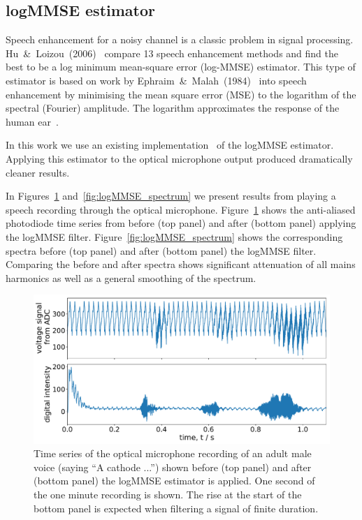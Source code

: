 \documentclass[paper-main.tex]{subfiles}
\begin{document}
\subsection{logMMSE estimator}
\label{sec:logmmse}

Speech enhancement for a noisy channel is a classic problem in signal processing. 
Hu~\&~Loizou~(2006)~\cite{SubjectiveComparison} compare 13 speech enhancement methods and find the best to be a log minimum mean-square error (log-MMSE) estimator. 
This type of estimator is based on work by Ephraim~\&~Malah~(1984)~\cite{Ephraim1984SpeechEU_logMMSE} into speech enhancement by minimising the mean square error (MSE) to the logarithm of the spectral (Fourier) amplitude.
The logarithm approximates the response of the human ear~\cite{SubjectiveComparison}.


In this work we use an existing implementation~\cite{logmmse} of the logMMSE estimator. 
Applying this estimator to the optical microphone output produced dramatically cleaner results. 

In Figures~\ref{fig:logMMSE_timeseries} and~\ref{fig:logMMSE_spectrum} we present results from playing a speech recording through the optical microphone. 
Figure~\ref{fig:logMMSE_timeseries} shows the anti-aliased photodiode time series from before (top panel) and after (bottom panel) applying the logMMSE filter. 
Figure~\ref{fig:logMMSE_spectrum} shows the corresponding spectra before (top panel) and after (bottom panel) the logMMSE filter. 
Comparing the before and after spectra shows significant attenuation of all mains harmonics as well as a general smoothing of the spectrum. 

\begin{figure}
	\includegraphics[width=\textwidth]{figures/filter_timeseries_aa_melatos-cropped.pdf}
	\caption{Time series of the optical microphone recording of an adult male voice (saying ``A cathode ...'') shown before (top panel) and after (bottom panel) the logMMSE estimator is applied. One second of the one minute recording is shown. The rise at the start of the bottom panel is expected when filtering a signal of finite duration.}
	\label{fig:logMMSE_timeseries}
\end{figure}
\end{document}
